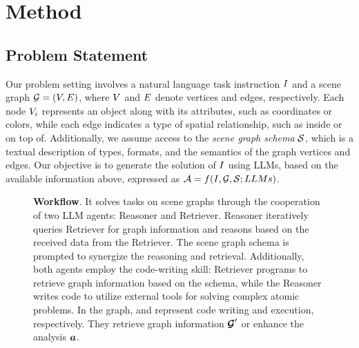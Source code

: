 \section{Method}

\subsection{Problem Statement}
Our problem setting involves a natural language task instruction ${I}$ and a scene graph ${\mathcal{G}} = (V, E)$, where $V$ and $E$ denote vertices and edges, respectively. Each node $V_i$ represents an object along with its attributes, such as coordinates or colors, while each edge indicates a type of spatial relationship, such as inside or on top of. Additionally, we assume access to the \textit{scene graph schema} ${\mathcal{S}}$, which is a textual description of types, formats, and the semantics of the graph vertices and edges. Our objective is to generate the solution of ${I}$ using LLMs, based on the available information above, expressed as ${\mathcal{A}} = f({I}, {\mathcal{G}}, {\mathcal{S}}; LLMs)$.

\begin{figure*}[t!]
 
  \centering
  \vspace*{-0.12in}
  \caption{\textbf{\RwR Workflow}.
  It solves tasks on scene graphs through the cooperation of two LLM agents: Reasoner and Retriever. Reasoner iteratively queries Retriever for graph information and reasons based on the received data from the Retriever. 
  The scene graph schema is prompted to synergize the reasoning and retrieval.
  Additionally, both agents employ the code-writing skill: Retriever programs to retrieve graph information based on the schema, while the Reasoner writes code to utilize external tools for solving complex atomic problems. In the graph, 
   and 
  represent code writing and execution, respectively.
  They retrieve graph information $\bm{{\mathcal{G}}}^\prime$ or enhance the analysis $\bm{a}$.
  }
  \vspace*{-0.15in}
 \label{fig:Method}
\end{figure*}

